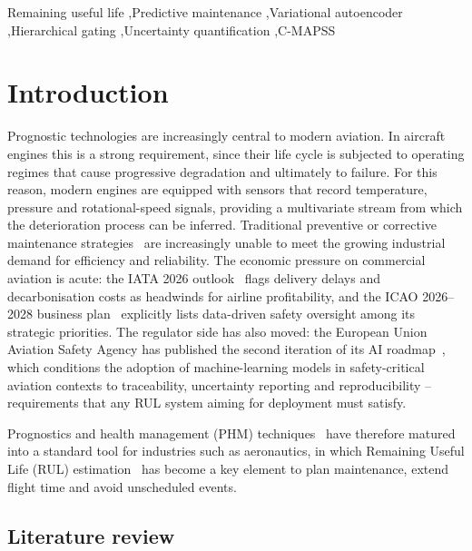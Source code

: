 \documentclass[5p,times,authoryear]{elsarticle}
\begin{document}
\begin{frontmatter}
\begin{keyword}
Remaining useful life \sep Predictive maintenance \sep Variational autoencoder \sep Hierarchical gating \sep Uncertainty quantification \sep C-MAPSS
\end{keyword}

\end{frontmatter}

\section{Introduction}\label{sec:intro}

Prognostic technologies are increasingly central to modern aviation. In aircraft engines this is a strong requirement, since their life cycle is subjected to operating regimes that cause progressive degradation and ultimately to failure. For this reason, modern engines are equipped with sensors that record temperature, pressure and rotational-speed signals, providing a multivariate stream from which the deterioration process can be inferred. Traditional preventive or corrective maintenance strategies~\citep{azadeh2015condition} are increasingly unable to meet the growing industrial demand for efficiency and reliability. The economic pressure on commercial aviation is acute: the {IATA} 2026 outlook~\citep{iata2026outlook} flags delivery delays and decarbonisation costs as headwinds for airline profitability, and the {ICAO} 2026--2028 business plan~\citep{icao2026plan} explicitly lists data-driven safety oversight among its strategic priorities. The regulator side has also moved: the European Union Aviation Safety Agency has published the second iteration of its AI roadmap~\citep{easa2025roadmap}, which conditions the adoption of machine-learning models in safety-critical aviation contexts to traceability, uncertainty reporting and reproducibility -- requirements that any RUL system aiming for deployment must satisfy.

Prognostics and health management (PHM) techniques~\citep{tian2012artificial,xu2021machine} have therefore matured into a standard tool for industries such as aeronautics, in which Remaining Useful Life (RUL) estimation~\citep{si2011remaining} has become a key element to plan maintenance, extend flight time and avoid unscheduled events.

\subsection{Literature review}\label{sec:literature}
\end{document}
